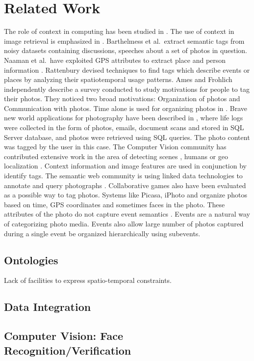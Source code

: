 \chapter{Related Work}

The role of context in computing has been studied in \cite{chen2000survey}. The use of context in image retrieval is emphasized in \cite{jain2010content, datta2008image}. Barthelmess et al.\ extract semantic tags from noisy datasets containing discussions, speeches about a set of photos in question\cite{barthelmess2007toward}. Naaman et al.\ have exploited GPS attributes to extract place and person information \cite{naaman2005leveraging, naaman2005identity}. Rattenbury \cite{rattenbury2009methods} devised techniques to find tags which describe events or places by analyzing their spatiotemporal usage patterns. Ames and Frohlich \cite{ames2007we, frohlich2002requirements} independently describe a survey conducted to study motivations for people to tag their photos. They noticed two broad motivations: Organization of photos and Communication with photos. Time alone is used for organizing photos in \cite{graham2002time, hailpern2011youpivot}. Brave new world applications for photography have been described in \cite{gemmell2002mylifebits, dumais2003stuff}, where life logs were collected in the form of photos, emails, document scans and stored in SQL Server database, and photos were retrieved using SQL queries. The photo content was tagged by the user in this case. The Computer Vision community has contributed extensive work in the area of detecting scenes \cite{xiao2010sun}, humans \cite{dalal2005histograms} or geo localization \cite{hays2008im2gps}. Context information and image features are used in conjunction by \cite{o2009context, cao2008annotating, boutell2005beyond, cao2008eventscene} identify tags. The semantic web community is using linked data technologies to annotate and query photographs \cite{monaghan2006automating, nowack2006confoto}. Collaborative games also have been evaluated as a possible way to tag photos\cite{diakopoulos2007photoplay}. Systems like Picasa, iPhoto and \cite{graham2002time} organize photos based on time, GPS coordinates and sometimes faces in the photo. These attributes of the photo do not capture event semantics \cite{sawant2011automatic}. Events are a natural way of categorizing photo media. Events also allow large number of photos captured during a single event be organized hierarchically using subevents.

\section{Ontologies}
Lack of facilities to express spatio-temporal constraints.

\section{Data Integration}

\section{Computer Vision: Face Recognition/Verification}